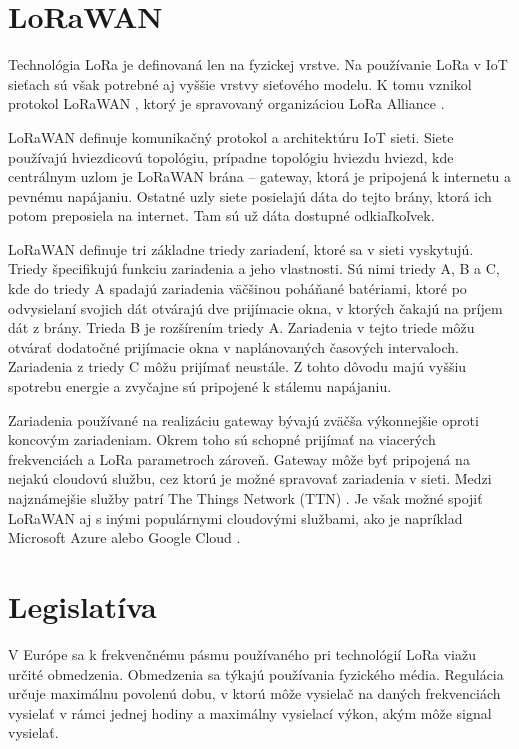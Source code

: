 \documentclass[slovak,master]{diploma}
\begin{document}
\section{LoRaWAN}
Technológia LoRa je definovaná len na fyzickej vrstve. Na používanie LoRa v IoT sieťach sú však potrebné aj vyššie vrstvy sieťového modelu.
K tomu vznikol protokol LoRaWAN \cite{lorawan}, ktorý je spravovaný organizáciou LoRa Alliance \cite{lora}.

LoRaWAN definuje komunikačný protokol a architektúru IoT sieti. Siete používajú hviezdicovú topológiu, prípadne topológiu hviezdu hviezd, kde 
centrálnym uzlom je LoRaWAN brána -- gateway, ktorá je pripojená k internetu a pevnému napájaniu. Ostatné uzly siete posielajú dáta do tejto brány, 
ktorá ich potom preposiela na internet. Tam sú už dáta dostupné odkiaľkoľvek.

LoRaWAN definuje tri základne triedy zariadení, ktoré sa v sieti vyskytujú. Triedy špecifikujú funkciu zariadenia a jeho vlastnosti.
Sú nimi triedy A, B a C, kde do triedy A spadajú zariadenia väčšinou poháňané batériami, ktoré po odvysielaní svojich dát otvárajú dve prijímacie okna, 
v ktorých čakajú na príjem dát z brány.
Trieda B je rozšírením triedy A. Zariadenia v tejto triede môžu otvárať dodatočné prijímacie okna v naplánovaných časových intervaloch.
Zariadenia z triedy C môžu prijímať neustále. Z tohto dôvodu majú vyššiu spotrebu energie a zvyčajne sú pripojené k stálemu napájaniu.

Zariadenia používané na realizáciu gateway bývajú zväčša výkonnejšie oproti koncovým zariadeniam. Okrem toho sú schopné prijímať na viacerých frekvenciách a
LoRa parametroch zároveň. Gateway môže byť pripojená na nejakú cloudovú službu, cez ktorú je možné spravovať zariadenia v sieti. Medzi najznámejšie 
služby patrí The Things Network (TTN) \cite{ttn}. Je však možné spojiť LoRaWAN aj s inými populárnymi cloudovými službami, ako je napríklad Microsoft Azure \cite{azure} 
alebo Google Cloud \cite{googleCloud}.

\section{Legislatíva}
V Európe sa k frekvenčnému pásmu používaného pri technológií LoRa viažu určité obmedzenia. 
Obmedzenia sa týkajú používania fyzického média. Regulácia určuje maximálnu povolenú dobu, v ktorú môže vysielač na daných frekvenciách vysielať 
v rámci jednej hodiny a maximálny vysielací výkon, akým môže signal vysielať.
\end{document}
